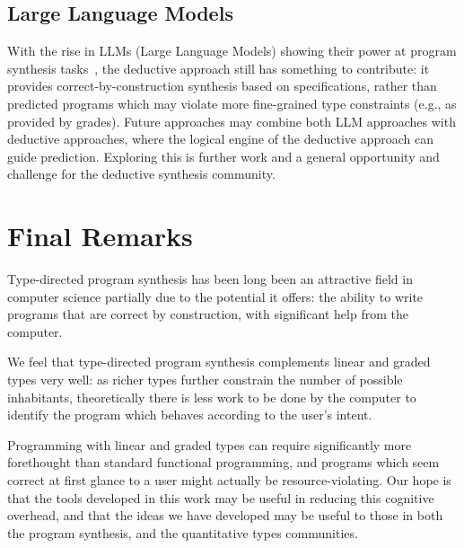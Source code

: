\subsection{Large Language Models}
With the rise in LLMs (Large Language Models) showing their power at program
synthesis tasks~\citep{DBLP:journals/corr/abs-2108-07732,jain2021jigsaw}, the
deductive approach still has something to contribute: it provides
correct-by-construction synthesis based on specifications, rather than predicted
programs which may violate more fine-grained type constraints (e.g., as provided
by grades). Future approaches may combine both LLM approaches with deductive
approaches, where the logical engine of the deductive approach can guide
prediction. Exploring this is further work and a general opportunity and
challenge for the deductive synthesis community.


\section{Final Remarks}
Type-directed program synthesis has been long been an attractive field in
computer science partially due to the potential it offers: the ability to write
programs that are correct by construction, with significant help from the
computer. 

We feel that type-directed program synthesis complements linear and graded types
very well: as richer types further constrain the number of possible inhabitants,
theoretically there is less work to be done by the computer to identify the
program which behaves according to the user's intent.

Programming with linear and graded types can require significantly more
forethought than standard functional programming, and programs which seem
correct at first glance to a user might actually be resource-violating. Our hope
is that the tools developed in this work may be useful in reducing this
cognitive overhead, and that the ideas we have developed may be useful to those
in both the program synthesis, and the quantitative types communities.